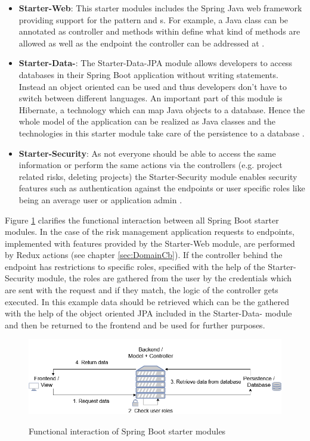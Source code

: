\begin{itemize}
	\item \textbf{Starter-Web}: This starter modules includes the Spring  Java web framework providing support for the  pattern and  s. For example, a Java class can be annotated as controller and methods within define what kind of  methods are allowed as well as the  endpoint the controller can be addressed at \cite[p. 107-109]{prasadreddyBeginningSpringBoot2017}. 
	\item \textbf{Starter-Data-}: The Starter-Data-JPA module allows developers to access databases in their Spring Boot application without writing  statements. Instead an object oriented  can be used and thus developers don’t have to switch between different languages. An important part of this module is Hibernate, a technology which can map Java objects to a database. Hence the whole model of the application can be realized as Java classes and the technologies in this starter module take care of the persistence to a database \cite[p. 83]{prasadreddyBeginningSpringBoot2017}. 
	\item \textbf{Starter-Security}: As not everyone should be able to access the same information or perform the same actions via the controllers (e.g. project related risks, deleting projects) the Starter-Security module enables security features such as authentication against the  endpoints or user specific roles like being an average user or application admin \cite[p. 176-176]{prasadreddyBeginningSpringBoot2017}. 
\end{itemize}

Figure \ref{fig:backenddetails} clarifies the functional interaction between all Spring Boot starter modules. In the case of the risk management application requests to  endpoints, implemented with features provided by the Starter-Web module, are performed by Redux actions (see chapter \ref{sec:DomainCb}). If the controller behind the  endpoint has restrictions to specific roles, specified with the help of the Starter-Security module, the roles are gathered from the user by the credentials which are sent with the request and if they match, the logic of the controller gets executed. In this example data should be retrieved which can be the gathered with the help of the object oriented JPA included in the Starter-Data- module and then be returned to the frontend and be used for further purposes. 

\begin{figure}[h]
	\centering
	\includegraphics[width=1\textwidth]{Content/Domain/BackendDetails.png}
	\caption{Functional interaction of Spring Boot starter modules}
	\cite{own representation}
	\label{fig:backenddetails}
\end{figure}

